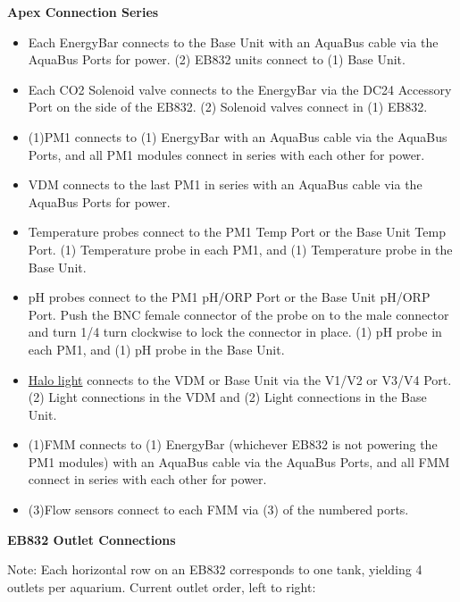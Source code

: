 \documentclass[]{book}
\providecommand{\tightlist}{%
  \setlength{\itemsep}{0pt}\setlength{\parskip}{0pt}}
\begin{document}
 \textbf{Apex Connection Series}

\begin{itemize}
\tightlist
\item
  Each EnergyBar connects to the Base Unit with an AquaBus cable via the
  AquaBus Ports for power. (2) EB832 units connect to (1) Base Unit.\\
\item
  Each CO2 Solenoid valve connects to the EnergyBar via the DC24
  Accessory Port on the side of the EB832. (2) Solenoid valves connect
  in (1) EB832.\\
\item
  (1)PM1 connects to (1) EnergyBar with an AquaBus cable via the AquaBus
  Ports, and all PM1 modules connect in series with each other for
  power.\\
\item
  VDM connects to the last PM1 in series with an AquaBus cable via the
  AquaBus Ports for power.\\
\item
  Temperature probes connect to the PM1 Temp Port or the Base Unit Temp
  Port. (1) Temperature probe in each PM1, and (1) Temperature probe in
  the Base Unit.\\
\item
  pH probes connect to the PM1 pH/ORP Port or the Base Unit pH/ORP Port.
  Push the BNC female connector of the probe on to the male connector
  and turn 1/4 turn clockwise to lock the connector in place. (1) pH
  probe in each PM1, and (1) pH probe in the Base Unit.\\
\item
  \href{https://github.com/SilbigerLab/Mesocosm_User_Manual/tree/394a3f7d9fed8765e4152f9fdd11d00a2ea87a93/Manuals/HALO_Quick_Start_Guide.pdf}{Halo
  light} connects to the VDM or Base Unit via the V1/V2 or V3/V4 Port.
  (2) Light connections in the VDM and (2) Light connections in the Base
  Unit.\\
\item
  (1)FMM connects to (1) EnergyBar (whichever EB832 is not powering the
  PM1 modules) with an AquaBus cable via the AquaBus Ports, and all FMM
  connect in series with each other for power.\\
\item
  (3)Flow sensors connect to each FMM via (3) of the numbered ports.
\end{itemize}

 \textbf{EB832 Outlet Connections}

Note: Each horizontal row on an EB832 corresponds to one tank, yielding
4 outlets per aquarium. Current outlet order, left to right:
\end{document}
